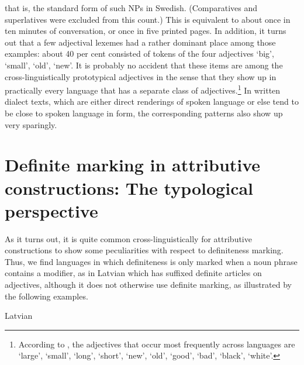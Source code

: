 that is, the standard form of such NPs in Swedish. (Comparatives and superlatives were excluded from this count.) This is equivalent to about once in ten minutes of conversation, or once in five printed pages. In addition, it turns out that a few adjectival lexemes had a rather dominant place among those examples: about 40 per cent consisted of tokens of the four adjectives ‘big’,  ‘small’,  ‘old’,  ‘new’. It is probably no accident that these items are among the cross-linguistically prototypical adjectives in the sense that they show up in practically every language that has a separate class of adjectives.\footnote{\label{fnt:ftn36} According to \citet{Dixon1977}, the adjectives that occur most frequently across languages are ‘large’, ‘small’, ‘long’, ‘short’, ‘new’, ‘old’, ‘good’, ‘bad’, ‘black’, ‘white’.} In written dialect texts, which are either direct renderings of spoken language or else tend to be close to spoken language in form, the corresponding patterns also show up very sparingly.


\section{Definite marking in attributive constructions: The typological perspective}

As it turns out, it is quite common cross-linguistically for attributive constructions to show some peculiarities with respect to definiteness marking. Thus, we find languages in which definiteness is only marked when a noun phrase contains a modifier, as in Latvian which has suffixed definite articles on adjectives, although it does not otherwise use definite marking, as illustrated by the following examples. 


\item 

Latvian


